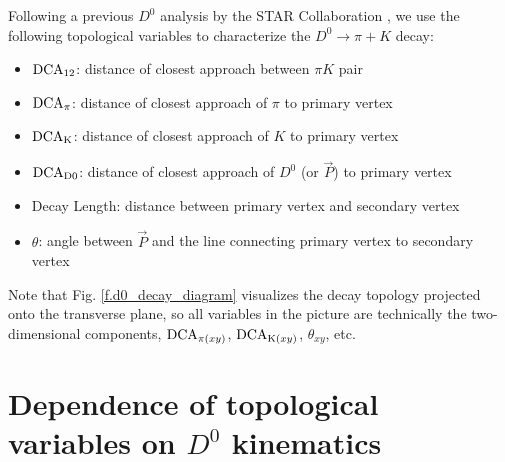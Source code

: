 Following a previous $D^0$ analysis by the STAR Collaboration \cite{STAR}, we use the following topological variables to characterize the $D^0\rightarrow\pi+K$ decay:
\begin{itemize}
    \item ${\rm DCA}_{12}$: distance of closest approach between $\pi K$ pair
    \item ${\rm DCA_\pi}$: distance of closest approach of $\pi$ to primary vertex
    \item ${\rm DCA_K}$: distance of closest approach of $K$ to primary vertex
    \item ${\rm DCA_{D0}}$: distance of closest approach of $D^0$ (or $\overrightarrow P$) to primary vertex
    \item Decay Length: distance between primary vertex and secondary vertex
    \item $\theta$: angle between $\overrightarrow{P}$ and the line connecting primary vertex to secondary vertex
\end{itemize}
Note that Fig. \ref{f.d0_decay_diagram} visualizes the decay topology projected onto the transverse plane, so all variables in the picture are technically the two-dimensional components, ${\rm DCA}_{{\rm \pi}{(xy)}}$,  ${\rm DCA}_{{\rm K}{(xy)}}$, $\theta_{xy}$, etc.


\section{Dependence of topological variables on $D^0$ kinematics}
\label{sec.d0_kinematics}


